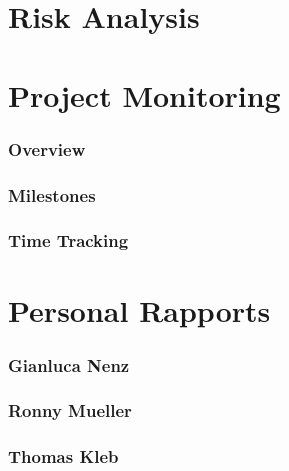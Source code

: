 \section{Risk Analysis}

\section{Project Monitoring}

\subsubsection*{Overview}

\subsubsection*{Milestones}

\subsubsection*{Time Tracking}

\section{Personal Rapports}

\subsubsection*{Gianluca Nenz}

\subsubsection*{Ronny Mueller}

\subsubsection*{Thomas Kleb}